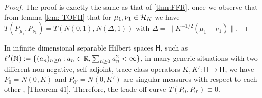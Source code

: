 \begin{proof}
    The proof is exactly the same as that of \ref{thm:FFR}, once we observe that from lemma \ref{lem: TOFH} that for $\mu_1, \nu_1 \in \mathcal{H}_{K}$ we have $T(P_{\mu_1}, P_{\nu_1}) = T(N(0,1), N(\Delta,1))$ with  $\Delta= \|K^{-1/2}(\mu_1- \nu_1)\|$.
\end{proof}


\begin{remark} In infinite dimensional separable Hilbert spaces $\mathsf H$, such as $\ell^2(\mathbb{N}):=\{(a_n)_{n\geq 0}: a_n\in \mathbb{R}, \sum_{n\geq 0} a_n^2 < \infty\}$, in many generic situations with two different non-negative, self-adjoint, trace-class operators $K,K' : \mathsf H \to \mathsf H$, we have $P_0= N(0,K)$ and $P_{0'}= N(0,K')$ are singular measures with respect to each other \cite{Bogachev1998GaussianMeasures}, \citet{krishnapur2025gaussian}[Theorem 41]. Therefore, the trade-off curve $T(P_0,P_{0'}) \equiv  0$.     
\end{remark}




